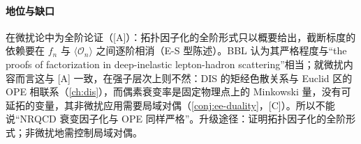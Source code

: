 \paragraph{地位与缺口}
在微扰论中为全阶论证（[A]）：拓扑因子化的全阶形式只以概要给出，截断标度的依赖要在 $f_n$ 与 $\langle\mathcal O_n\rangle$ 之间逐阶相消（E-S 型陈述）。BBL 认为其严格程度与“the proofs of factorization in deep-inelastic lepton-hadron scattering”相当\cite[第~VI.A~节]{BodwinBraatenLepage1995}；就微扰内容而言这与 [A] 一致，在强子层次上则不然：DIS 的矩经色散关系与 Euclid 区的 OPE 相联系（\cref{ch:dis}），而偶素衰变率是固定物理点上的 Minkowski 量，没有可延拓的变量，其非微扰应用需要局域对偶（\cref{conj:ee-duality}，[C]）。所以不能说“NRQCD 衰变因子化与 OPE 同样严格”。升级途径：证明拓扑因子化的全阶形式；非微扰地需控制局域对偶。

